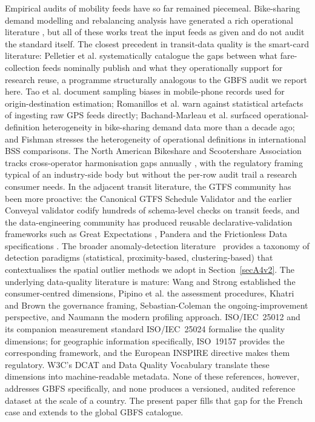 \documentclass[11pt,a4paper]{article}
\begin{document}
Empirical audits of mobility feeds have so far remained piecemeal.
Bike-sharing demand modelling and rebalancing analysis have generated
a rich operational literature
\cite{Buehler2017BikeShare,Medard2017Rebalancing,Eren2020Review}, but
all of these works treat the input feeds as given and do not audit
the standard itself. The closest precedent in transit-data quality
is the smart-card literature: Pelletier et al.
\cite{Pelletier2011SmartCard} systematically catalogue the gaps
between what fare-collection feeds nominally publish and what they
operationally support for research reuse, a programme structurally
analogous to the GBFS audit we report here.
Tao et al. \cite{Tao2020} document sampling biases in
mobile-phone records used for origin-destination estimation;
Romanillos et al. \cite{Romanillos2016} warn against
statistical artefacts of ingesting raw GPS feeds directly;
Bachand-Marleau et al. \cite{BachandMarleau2012} surfaced
operational-definition heterogeneity in bike-sharing demand data
more than a decade ago; and Fishman \cite{Fishman2016} stresses the
heterogeneity of operational definitions in international BSS
comparisons. The North American Bikeshare and Scootershare
Association tracks cross-operator harmonisation gaps annually
\cite{NABSA2024StateOfIndustry}, with the regulatory framing
typical of an industry-side body but without the per-row audit
trail a research consumer needs.
In the adjacent transit literature, the GTFS community has been more
proactive: the Canonical GTFS Schedule Validator
\cite{MobilityData2024Validator} and the earlier Conveyal validator
\cite{Antrim2013Conveyal} codify hundreds of schema-level checks on
transit feeds, and the data-engineering community has produced reusable
declarative-validation frameworks such as Great Expectations
\cite{GreatExpectations2024}, Pandera \cite{Pandera2024} and the
Frictionless Data specifications \cite{FrictionlessData2023}.
The broader anomaly-detection literature~\cite{Chandola2009AnomalyDetection}
provides a taxonomy of detection paradigms (statistical, proximity-based,
clustering-based) that contextualises the spatial outlier methods we
adopt in Section~\ref{secA4v2}.
The underlying data-quality literature is mature: Wang and Strong
\cite{Wang1996Quality} established the consumer-centred dimensions,
Pipino et al. \cite{Pipino2002Assessment} the assessment
procedures, Khatri and Brown \cite{Khatri2010DataGovernance} the
governance framing, Sebastian-Coleman \cite{SebastianColeman2013}
the ongoing-improvement perspective, and Naumann
\cite{Naumann2014DataProfiling} the modern profiling approach. ISO/IEC~25012 \cite{ISO25012} and its companion
measurement standard ISO/IEC~25024 \cite{ISO25024} formalise the
quality dimensions; for geographic information specifically,
ISO~19157 \cite{ISO19157} provides the corresponding framework, and
the European INSPIRE directive \cite{INSPIRE2007} makes them
regulatory. W3C's DCAT \cite{DCAT2020} and Data Quality Vocabulary
\cite{W3CDQV} translate these dimensions into machine-readable
metadata. None of these references, however, addresses GBFS
specifically, and none produces a versioned, audited reference
dataset at the scale of a country. The present paper fills that gap
for the French case and extends to the global GBFS catalogue.
\end{document}
